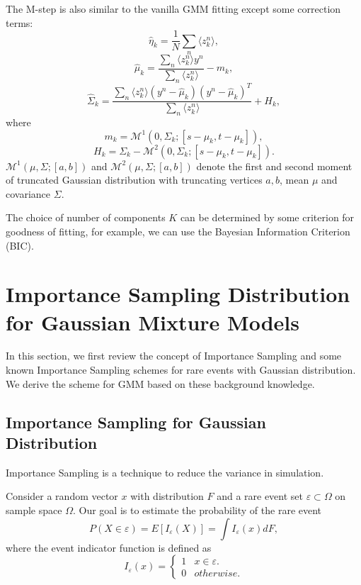 \documentclass[conference]{IEEEtran}
\begin{document}
The M-step is also similar to the vanilla GMM fitting except some correction terms:
\begin{equation}
\hat{\eta}_k =\frac{1}{N} \sum_n \langle z_k^n \rangle ,
\end{equation}
\begin{equation}
\hat{\mu}_k =\frac{\sum_n \langle z_k^n \rangle y^n}{\sum_n \langle z_k^n \rangle} - m_k ,
\end{equation}
\begin{equation}
\hat{\Sigma}_k =\frac{\sum_n \langle z_k^n \rangle (y^n-\hat{\mu}_k)(y^n-\hat{\mu}_k)^T}{\sum_n \langle z_k^n \rangle}+ H_k ,
\end{equation}
where\begin{equation}
m_k=\mathcal{M}^1(0,\Sigma_k;[s-\mu_k,t-\mu_k]),
\end{equation}
\begin{equation}
H_k=\Sigma_k-\mathcal{M}^2(0,\Sigma_k;[s-\mu_k,t-\mu_k]).
\end{equation}
$\mathcal{M}^1(\mu,\Sigma;[a,b])$ and $\mathcal{M}^2(\mu,\Sigma;[a,b])$ denote the first and second moment of truncated Gaussian distribution with truncating vertices $a,b$, mean $\mu$ and covariance $\Sigma$.

The choice of number of components $K$ can be determined by some criterion for goodness of fitting, for example, we can use the Bayesian Information Criterion (BIC).

\section{Importance Sampling Distribution for Gaussian Mixture Models}\label{sec:is}
In this section, we first review the concept of Importance Sampling and some known Importance Sampling schemes for rare events with Gaussian distribution. We derive the scheme for GMM based on these background knowledge.
\subsection{Importance Sampling for Gaussian Distribution}
Importance Sampling is a technique to reduce the variance in simulation. 

Consider a random vector $x$ with distribution $F$ and a rare event set $\varepsilon \subset \Omega$ on sample space $\Omega$. Our goal is to estimate the probability of the rare event \begin{equation}
{P}(X \in \varepsilon)=E[I_\varepsilon(X)]=\int I_\varepsilon(x) dF,
\end{equation} where the event indicator function is defined as\begin{equation}
	I_\varepsilon(x)=\begin{cases} 1 & x \in \varepsilon.\\
0 & otherwise.\end{cases}
\end{equation}
\end{document}
